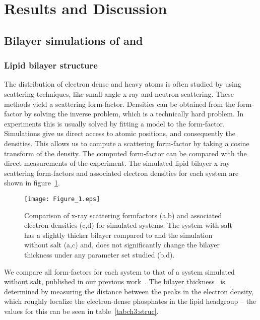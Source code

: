 \section{Results and Discussion}
\subsection{Bilayer simulations of \li{} and \mg{}}
\subsubsection{Lipid bilayer structure}
The distribution of electron dense and heavy atoms is often studied by using
scattering techniques, like small-angle x-ray and neutron scattering. 
These methods
yield a scattering form-factor.  Densities can be obtained from the form-factor by solving
the inverse problem, which is a technically hard problem. In experiments this is usually solved by fitting a model to the form-factor.
Simulations give us direct access to atomic positions, and consequently
the densities. This allows us to compute a scattering form-factor by taking a cosine transform of the density{. The computed
form-factor}
can be compared with the direct measurements of the experiment.
The simulated lipid bilayer x-ray scattering form-factors and associated 
electron densities for each system are shown in figure~\ref{figch3:eledens}.
\begin{figure}[H]
    \caption[Comparison of SAXS formfactors]{Comparison of x-ray scattering formfactors (a,b) and associated electron densities (c,d) for simulated systems. 
    {The system with \li{}{} salt has a slightly thicker bilayer compared to \na and the simulation without salt (a,c) and},
    \mg does not significantly change the bilayer thickness
    under any parameter set studied (b,d). }
    \label{figch3:eledens}
    \texttt{[image: Figure\_1.eps]}
\end{figure}
We compare all form-factors for each system to that of a system simulated without salt, published
in our previous work~\cite{kruczek:2017}.
The bilayer thickness \dhh~is determined by measuring the distance between the
peaks in the electron density, which roughly localize the electron-dense phosphates in the
lipid headgroup -- the values for this can be seen in table~\ref{tabch3:struc}.
